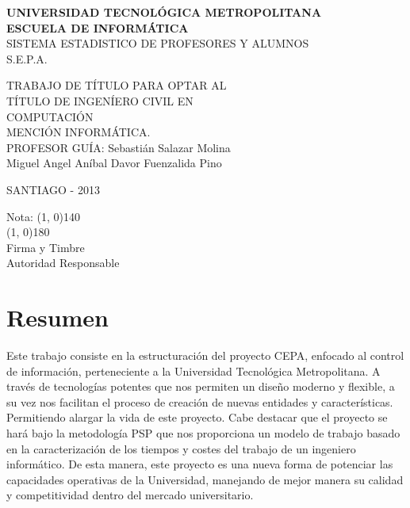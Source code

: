 \documentclass[a4paper,12pt,openany,oneside]{book}
\begin{document}
\thispagestyle{empty}
\begin{center}
\textbf{UNIVERSIDAD TECNOLÓGICA METROPOLITANA\\
ESCUELA DE INFORMÁTICA}\\
\vspace{3cm}
SISTEMA ESTADISTICO DE PROFESORES Y ALUMNOS\\S.E.P.A.
\end{center}
\begin{flushright}
TRABAJO DE TÍTULO PARA OPTAR AL\\
TÍTULO DE INGENÍERO CIVIL EN\\
COMPUTACIÓN\\
MENCIÓN INFORMÁTICA.\\
\vspace{3cm}
PROFESOR GUÍA: Sebastián Salazar Molina\\
\vspace{1.5cm}
Miguel Angel Aníbal Davor Fuenzalida Pino
\end{flushright}
\vspace{4cm}
\begin{center}
SANTIAGO - 2013
\end{center}
\newpage
\thispagestyle{empty}
\begin{flushright}
\vspace{20mm}
Nota: \line(1, 0){140} \\
\vspace{30 mm}
\line(1, 0){180}\\	
Firma y Timbre\\
Autoridad Responsable
\end{flushright}
\chapter*{Resumen}
\thispagestyle{empty}
Este trabajo consiste en la estructuración del proyecto CEPA, enfocado al control de información, perteneciente a la Universidad Tecnológica Metropolitana. A través de tecnologías potentes que nos permiten un diseño moderno y flexible, a su vez nos facilitan el proceso de creación de nuevas entidades y características. Permitiendo alargar la vida de este proyecto. Cabe destacar que el proyecto se hará bajo la metodología PSP que nos proporciona un modelo de trabajo basado en la caracterización de los tiempos y costes del trabajo de un ingeniero informático. De esta manera, este proyecto es una nueva forma de potenciar las capacidades operativas de la Universidad, manejando de mejor manera su calidad y competitividad dentro del mercado universitario.
\end{document}
